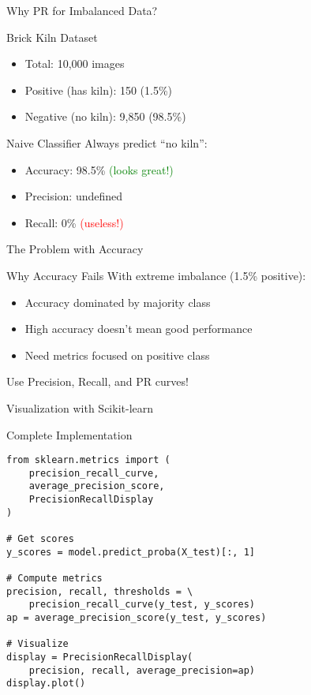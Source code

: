 \documentclass{beamer}
\begin{document}
\begin{frame}{Why PR for Imbalanced Data?}
\begin{examplebox}{Brick Kiln Dataset}
\begin{itemize}
    \item Total: 10,000 images
    \item Positive (has kiln): 150 (1.5\%)
    \item Negative (no kiln): 9,850 (98.5\%)
\end{itemize}
\end{examplebox}

\vspace{0.3cm}

\begin{alertblock}{Naive Classifier}
Always predict ``no kiln'':
\begin{itemize}
    \item Accuracy: 98.5\% \textcolor{green}{(looks great!)}
    \item Precision: undefined
    \item Recall: 0\% \textcolor{red}{(useless!)}
\end{itemize}
\end{alertblock}
\end{frame}

\begin{frame}{The Problem with Accuracy}
\begin{keypointsbox}{Why Accuracy Fails}
With extreme imbalance (1.5\% positive):
\begin{itemize}
    \item Accuracy dominated by majority class
    \item High accuracy doesn't mean good performance
    \item Need metrics focused on positive class
\end{itemize}
\end{keypointsbox}

\vspace{0.3cm}

\begin{center}
\Large
Use Precision, Recall, and PR curves!
\end{center}
\end{frame}

\begin{frame}[fragile]{Visualization with Scikit-learn}
\begin{block}{Complete Implementation}
\small
\begin{verbatim}
from sklearn.metrics import (
    precision_recall_curve,
    average_precision_score,
    PrecisionRecallDisplay
)

# Get scores
y_scores = model.predict_proba(X_test)[:, 1]

# Compute metrics
precision, recall, thresholds = \
    precision_recall_curve(y_test, y_scores)
ap = average_precision_score(y_test, y_scores)

# Visualize
display = PrecisionRecallDisplay(
    precision, recall, average_precision=ap)
display.plot()
\end{verbatim}
\end{block}
\end{frame}
\end{document}
